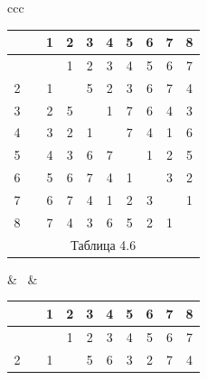 \begin{center}





\begin{tabular}{ccc}





\begin{tabular}{cccccccccc}


\ & \vline & 1 & 2 & 3 & 4 & 5 & 6 & 7 & 8 \\


\hline


 1 & \vline & \ & 1 & 2 & 3 & 4 & 5 & 6 & 7 \\


2 & \vline & 1 & \ & 5 & 2 & 3 & 6 & 7 & 4 \\


3 & \vline & 2 & 5 & \ & 1 & 7 & 6 & 4 & 3 \\


4 & \vline & 3 & 2 & 1 & \ & 7 & 4 & 1 & 6 \\


5 & \vline & 4 & 3 & 6 & 7 & \ & 1 & 2 & 5 \\


6 & \vline & 5 & 6 & 7 & 4 & 1 & \ & 3 & 2 \\


7 & \vline & 6 & 7 & 4 & 1 & 2 & 3 & \ & 1 \\


8 & \vline & 7 & 4 & 3 & 6 & 5 & 2 & 1 & \ \\


\multicolumn{10}{c}{ Таблица 4.6}


\end{tabular}





& \ & 





\begin{tabular}{cccccccccc}


\ & \vline & 1 & 2 & 3 & 4 & 5 & 6 & 7 & 8 \\


\hline


 1 & \vline & \ & 1 & 2 & 3 & 4 & 5 & 6 & 7 \\


2 & \vline & 1 & \ & 5 & 6 & 3 & 2 & 7 & 4 \\



\end{tabular}
\end{tabular}
\end{center}
